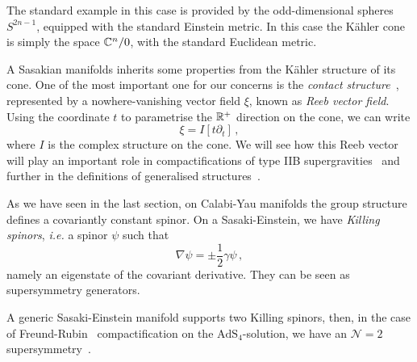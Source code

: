 \documentclass[debug]{phd}
\begin{document}
					The standard example in this case is provided by the odd-dimensional spheres $S^{2n-1}$, equipped with the standard Einstein metric.
					In this case the K\"ahler cone is simply the space $\mathbb{C}^n / {0}$, with the standard Euclidean metric.
					
					A Sasakian manifolds inherits some properties from the K\"ahler structure of its cone.
					One of the most important one for our concerns is the \emph{contact structure}~\cite{contact1}, represented by a nowhere-vanishing vector field $\xi$, known as \emph{Reeb vector field}.
					Using the coordinate $t$ to parametrise the $\mathbb{R}^+$ direction on the cone, we can write
							\begin{equation}\label{Reeb1}
								\xi = I\left[ t \partial_t \right]\, ,
							\end{equation}
					where $I$ is the complex structure on the cone.
					We will see how this Reeb vector will play an important role in compactifications of type IIB supergravities~\cite{DavideSas1, DavideTriSas} and further in the definitions of generalised structures~\cite{AshmoreESE}.
					
					As we have seen in the last section, on Calabi-Yau manifolds the group structure defines a covariantly constant spinor.
					On a Sasaki-Einstein, we have \emph{Killing spinors}, \emph{i.e.} a spinor $\psi$ such that
							\begin{equation}
								\nabla \psi = \pm \frac{1}{2} \gamma \psi \, ,
							\end{equation}
					namely an eigenstate of the covariant derivative.
					They can be seen as supersymmetry generators.
					 
					A generic Sasaki-Einstein manifold supports two Killing spinors, then, in the case of Freund-Rubin~\cite{FreundRubin} compactification on the $\mathrm{AdS}_4$-solution, we have an $\mathcal{N}=2$ supersymmetry~\cite{duffKK}.
					
\end{document}
